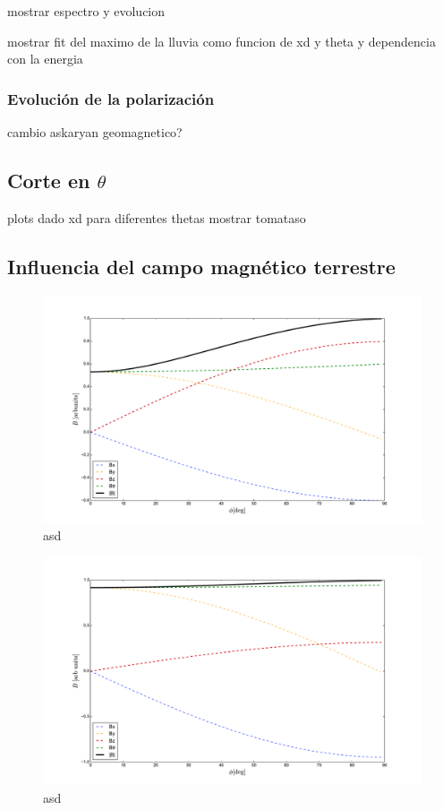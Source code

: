 	mostrar espectro y evolucion
	
	mostrar fit del maximo de la lluvia como funcion de xd y theta y dependencia con la energia
	
		\subsubsection{Evoluci\'on de la polarizaci\'on}
		
		cambio askaryan geomagnetico?
	
	\subsection{Corte en $\theta$}
	
	plots dado xd para diferentes thetas
	mostrar tomataso
	
	\clearpage
	\subsection{Influencia del campo magn\'etico terrestre}
	
	\begin{figure}[ht!]
		\centering
		\includegraphics[width=\textwidth]{./fig/EASRadio/geomComps_Malarge}
		\caption{\label{fig:geomComps_Malarge}
		asd
		}
	\end{figure}
	
	\begin{figure}[ht!]
		\centering
		\includegraphics[width=\textwidth]{./fig/EASRadio/geomComps_Tunka}
		\caption{\label{fig:geomComps_Tunka}
		asd
		}
	\end{figure}
	
